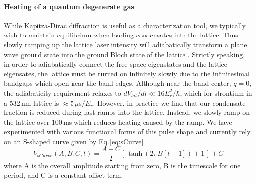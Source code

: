 \paragraph{Heating of a quantum degenerate gas}
While Kapitza-Dirac diffraction is useful as a characterization tool, we typically wish to maintain equilibrium when loading condensates into the lattice. 
Thus slowly ramping up the lattice laser intensity will adiabatically transform a plane wave ground state into the ground Bloch state of the lattice \cite{Sakurai2010}. 
Strictly speaking, in order to adiabatically connect the free space eigenstates and the lattice eigensates, the lattice must be turned on infinitely slowly due to the infinitesimal bandgaps which open near the band edges. 
Although near the band center, $q=0$, the adiabaticity requirement relaxes to $dV_{lat}/dt \ll 16E_r^2/ \hbar$, \cite{Denschlag2002} which for strontium in a 532\,nm lattice is $\approx 5\,\mu$s$/E_r$. However, in practice we find that our condensate fraction is reduced during fast ramps into the lattice. 
Instead, we slowly ramp on the lattice over 100\,ms which reduces heating caused by the ramp. 
We have experimented with various functional forms of this pulse shape and currently rely on an S-shaped curve given by Eq.\,\ref{eq:sCurve}
\begin{equation} \label{eq:sCurve}
	V_{sCurve}(A,B,C,t) = \frac{A-C}{2} \left[ \, \tanh (2 \pi B[t-1])+1 \, \right] + C
\end{equation}
where A is the overall amplitude starting from zero, B is the timescale for one period, and C is a constant offset term.

